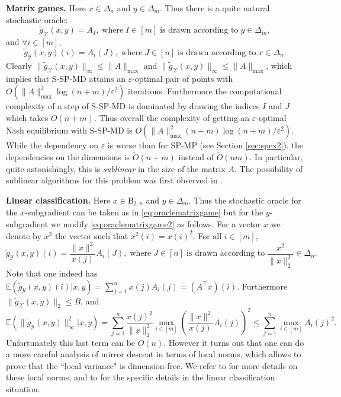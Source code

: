 \documentclass[openany]{now}
\newcommand{\mB}{\mathrm{B}}
\newcommand{\tg}{\tilde{g}}
\newcommand{\E}{\mathbb{E}}
\newcommand{\cX}{\mathcal{X}}
\newcommand{\cY}{\mathcal{Y}}
\renewcommand{\epsilon}{\varepsilon}
\renewcommand{\tilde}{\widetilde}
\begin{document}
\noindent
\textbf{Matrix games.} Here $x \in \Delta_n$ and $y \in \Delta_m$. Thus there is a quite natural stochastic oracle:
\begin{equation} \label{eq:oraclematrixgame}
\tg_{\cX}(x,y) = A_I, \; \text{where} \; I \in [m] \; \text{is drawn according to} \; y \in \Delta_m ,
\end{equation}
and $\forall i \in [m]$,
\begin{equation} \label{eq:oraclematrixgame2}
\tg_{\cY}(x,y)(i) = A_i(J), \; \text{where} \; J \in [n] \; \text{is drawn according to} \; x \in \Delta_n .
\end{equation}
Clearly $\|\tg_{\cX}(x,y)\|_{\infty} \leq \|A\|_{\mathrm{max}}$ and $\|\tg_{\cX}(x,y)\|_{\infty} \leq \|A\|_{\mathrm{max}}$, which implies that S-SP-MD attains an $\epsilon$-optimal pair of points with $O\left(\|A\|_{\mathrm{max}}^2 \log(n+m) / \epsilon^2 \right)$ iterations. Furthermore the computational complexity of a step of S-SP-MD is dominated by drawing the indices $I$ and $J$ which takes $O(n + m)$. Thus overall the complexity of getting an $\epsilon$-optimal Nash equilibrium with S-SP-MD is $O\left(\|A\|_{\mathrm{max}}^2 (n + m) \log(n+m) / \epsilon^2  \right)$. While the dependency on $\epsilon$ is worse than for SP-MP (see Section \ref{sec:spex2}), the dependencies on the dimensions is $\tilde{O}(n+m)$ instead of $\tilde{O}(nm)$. In particular, quite astonishingly, this is {\em sublinear} in the size of the matrix $A$. The possibility of sublinear algorithms for this problem was first observed in \cite{GK95}.
\newline

\noindent
\textbf{Linear classification.} Here $x \in \mB_{2,n}$ and $y \in \Delta_m$. Thus the stochastic oracle for the $x$-subgradient can be taken as in \eqref{eq:oraclematrixgame} but for the $y$-subgradient we modify \eqref{eq:oraclematrixgame2} as follows. For a vector $x$ we denote by $x^2$ the vector such that $x^2(i) = x(i)^2$. For all $i \in [m]$,
$$\tg_{\cY}(x,y)(i) = \frac{\|x\|^2}{x(j)} A_i(J), \; \text{where} \; J \in [n] \; \text{is drawn according to} \; \frac{x^2}{\|x\|_2^2} \in \Delta_n .$$ 
Note that one indeed has $\E (\tg_{\cY}(x,y)(i) | x,y) = \sum_{j=1}^n x(j) A_i(j) = (A^{\top} x)(i)$.
Furthermore $\|\tg_{\cX}(x,y)\|_2 \leq B$, and
$$\E (\|\tg_{\cY}(x,y)\|_{\infty}^2 | x,y) = \sum_{j=1}^n \frac{x(j)^2}{\|x\|_2^2} \max_{i \in [m]} \left(\frac{\|x\|^2}{x(j)} A_i(j)\right)^2 \leq \sum_{j=1}^n \max_{i \in [m]} A_i(j)^2 .$$
Unfortunately this last term can be $O(n)$. However it turns out that one can do a more careful analysis of mirror descent in terms of local norms, which allows to prove that the ``local variance" is dimension-free. We refer to \cite{BC12} for more details on these local norms, and to \cite{CHW12} for the specific details in the linear classification situation.
\end{document}
